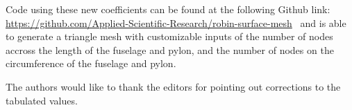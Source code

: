 \documentclass{ahs}
\begin{document}
\begin{table}[ht]
\begin{centering}
\label{pycoeff}
\end{centering}
\end{table}

Code using these 
new coefficients can be found at the following Github link: \url{https://github.com/Applied-Scientific-Research/robin-surface-mesh}~ 
and is able to generate a triangle mesh with customizable inputs of the number of nodes accross the length of the fuselage and pylon, and the number of 
nodes on the circumference of the fuselage and pylon.

The authors would like to thank the editors for pointing out corrections to the tabulated values.



\end{document}
